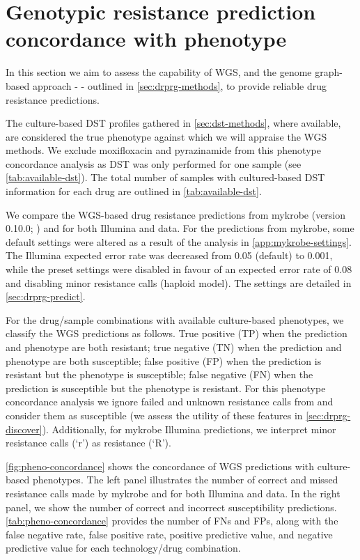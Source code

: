 \section{Genotypic resistance prediction concordance with phenotype}
\label{sec:pheno-concordance}

In this section we aim to assess the capability of \ont{} WGS, and the genome graph-based approach - \drprg{} - outlined in \autoref{sec:drprg-methods}, to provide reliable drug resistance predictions.

The culture-based DST profiles gathered in \autoref{sec:dst-methods}, where available, are considered the true phenotype against which we will appraise the WGS methods. We exclude moxifloxacin and pyrazinamide from this phenotype concordance analysis as DST was only performed for one sample (see \autoref{tab:available-dst}). The total number of samples with cultured-based DST information for each drug are outlined in \autoref{tab:available-dst}.

We compare the WGS-based drug resistance predictions from mykrobe (version 0.10.0; \cite{hunt2019}) and \drprg{} for both Illumina and \ont{} data. For the predictions from mykrobe, some default settings were altered as a result of the analysis in \autoref{app:mykrobe-settings}. The Illumina expected error rate was decreased from 0.05 (default) to 0.001, while the preset \ont{} settings were disabled in favour of an expected error rate of 0.08 and disabling minor resistance calls (haploid model). The \drprg{} settings are detailed in \autoref{sec:drprg-predict}. 

For the drug/sample combinations with available culture-based phenotypes, we classify the WGS predictions as follows. True positive (TP) when the prediction and phenotype are both resistant; true negative (TN) when the prediction and phenotype are both susceptible; false positive (FP) when the prediction is resistant but the phenotype is susceptible; false negative (FN) when the prediction is susceptible but the phenotype is resistant. For this phenotype concordance analysis we ignore failed and unknown resistance calls from \drprg{} and consider them as susceptible (we assess the utility of these features in \autoref{sec:drprg-discover}). Additionally, for mykrobe Illumina predictions, we interpret minor resistance calls (`r') as resistance (`R').

\autoref{fig:pheno-concordance} shows the concordance of WGS predictions with culture-based phenotypes. The left panel illustrates the number of correct and missed resistance calls made by mykrobe and \drprg{} for both Illumina and \ont{} data. In the right panel, we show the number of correct and incorrect susceptibility predictions. \autoref{tab:pheno-concordance} provides the number of FNs and FPs, along with the false negative rate, false positive rate, positive predictive value, and negative predictive value for each technology/drug combination. 

